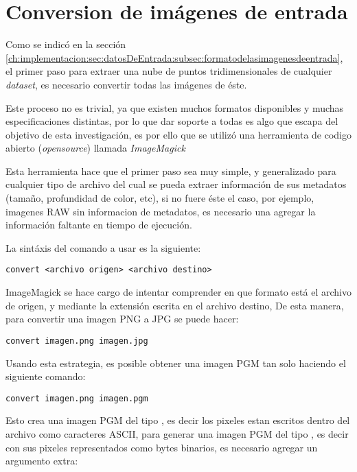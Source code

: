\section{Conversion de imágenes de entrada}
\label{ch:implementacion:sec:conversiondeimagenesdeentrada}

Como se indicó en la sección \ref{ch:implementacion:sec:datosDeEntrada:subsec:formatodelasimagenesdeentrada}, el primer paso para extraer una nube de puntos tridimensionales de cualquier \emph{dataset}, es necesario convertir todas las imágenes de éste.

Este proceso no es trivial, ya que existen muchos formatos disponibles y muchas especificaciones distintas, por lo que dar soporte a todas es algo que escapa del objetivo de esta investigación, es por ello que se utilizó una herramienta de codigo abierto (\emph{opensource}) llamada \emph{ImageMagick}

Esta herramienta hace que el primer paso sea muy simple, y generalizado para cualquier tipo de archivo del cual se pueda extraer información de sus metadatos (tamaño, profundidad de color, etc), si no fuere éste el caso, por ejemplo, imagenes RAW sin informacion de metadatos, es necesario una agregar la información faltante en tiempo de ejecución.

La sintáxis del comando a usar es la siguiente:

\begin{verbatim}
convert <archivo origen> <archivo destino>
\end{verbatim}

ImageMagick se hace cargo de intentar comprender en que formato está el archivo de origen, y mediante la extensión escrita en el archivo destino, De esta manera, para convertir una imagen PNG a JPG se puede hacer:

\begin{verbatim}
convert imagen.png imagen.jpg
\end{verbatim}

Usando esta estrategia, es posible obtener una imagen PGM tan solo haciendo el siguiente comando:

\begin{verbatim}
convert imagen.png imagen.pgm
\end{verbatim}

Esto crea una imagen PGM del tipo , es decir los pixeles estan escritos dentro del archivo como caracteres ASCII, para generar una imagen PGM del tipo , es decir con sus pixeles representados como bytes binarios, es necesario agregar un argumento extra:

